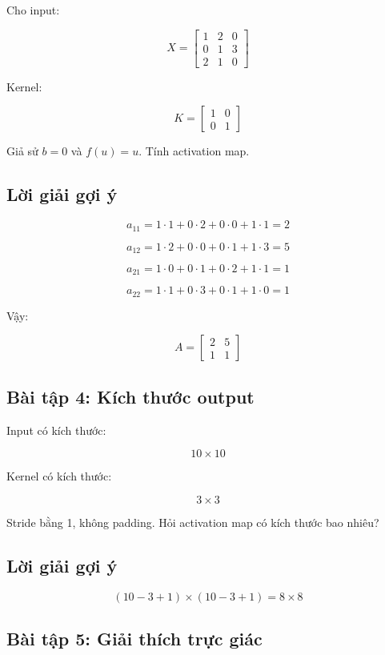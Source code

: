 Cho input:

\[
    X =
    \begin{bmatrix}
    1 & 2 & 0\\
    0 & 1 & 3\\
    2 & 1 & 0
    \end{bmatrix}
\]

Kernel:

\[
    K =
    \begin{bmatrix}
    1 & 0\\
    0 & 1
    \end{bmatrix}
\]

Giả sử $b=0$ và $f(u)=u$. Tính activation map.

\subsection*{Lời giải gợi ý}

\[
    a_{11}=1\cdot1+0\cdot2+0\cdot0+1\cdot1=2
\]

\[
    a_{12}=1\cdot2+0\cdot0+0\cdot1+1\cdot3=5
\]

\[
    a_{21}=1\cdot0+0\cdot1+0\cdot2+1\cdot1=1
\]

\[
    a_{22}=1\cdot1+0\cdot3+0\cdot1+1\cdot0=1
\]

Vậy:

\[
    A =
    \begin{bmatrix}
    2 & 5\\
    1 & 1
    \end{bmatrix}
\]

\subsection*{Bài tập 4: Kích thước output}

Input có kích thước:

\[
    10\times10
\]

Kernel có kích thước:

\[
    3\times3
\]

Stride bằng 1, không padding. Hỏi activation map có kích thước bao nhiêu?

\subsection*{Lời giải gợi ý}

\[
    (10-3+1)\times(10-3+1)=8\times8
\]

\subsection*{Bài tập 5: Giải thích trực giác}

